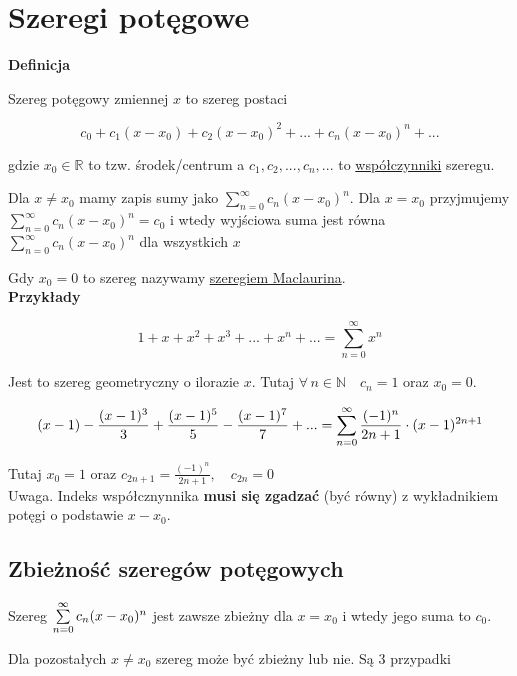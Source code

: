 \section{Szeregi potęgowe}

\textbf{Definicja}

Szereg potęgowy zmiennej $x$ to szereg postaci

$$ c_0 + c_1(x - x_0) + c_2(x- x_0)^2 + ... + c_n(x - x_0)^n + ... $$

gdzie $x_0 \in \mathbb{R} $ to tzw. środek/centrum a $ c_1, c_2, ..., c_n, ... $ to \underline{współczynniki} szeregu.

Dla $x \neq x_0$ mamy zapis sumy jako $ \sum\limits_{n = 0}^{\infty} c_n(x - x_0)^n $. Dla $x = x_0$ przyjmujemy
$ \sum\limits_{n = 0}^{\infty} c_n(x - x_0)^n = c_0 $ i wtedy wyjściowa suma jest równa $ \sum\limits_{n = 0}^{\infty} c_n(x - x_0)^n $
dla wszystkich $x$

Gdy $x_0 = 0$ to szereg nazywamy \underline{szeregiem Maclaurina}. \\

\textbf{Przykłady}

$$ 1 + x + x^2 + x^3 + ... + x^n + ... = \sum\limits_{n = 0}^{\infty} x^n $$

Jest to szereg geometryczny o ilorazie $x$. Tutaj $ \forall \, n \in \mathbb{N} \quad c_n = 1 $ oraz $x_0 = 0$.

$$ (x - 1) - \frac{(x-1)^3}{3} + \frac{(x-1)^5}{5} - \frac{(x-1)^7}{7} + ... 
= \sum\limits_{n = 0}^{\infty} \frac{ (-1)^n }{ 2n+1 } \cdot (x-1)^{2n+1} $$

Tutaj $x_0 = 1$ oraz $ c_{2n+1} = \frac{ (-1)^n }{ 2n+1 }, \quad c_{2n} = 0 $ \\

Uwaga. Indeks współcznynnika \textbf{musi się zgadzać} (być równy) z wykładnikiem potęgi o podstawie $x-x_0$.


\subsection*{Zbieżność szeregów potęgowych}

Szereg $ \sum\limits_{n = 0}^{\infty} c_n(x-x_0)^n $ jest zawsze zbieżny dla $x=x_0$ i wtedy jego suma to $c_0$.

Dla pozostałych $x \neq x_0$ szereg może być zbieżny lub nie. Są 3 przypadki

